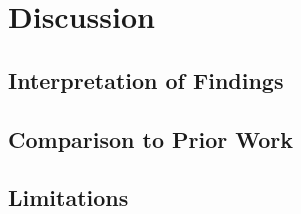 \chapter{Discussion}
\label{ch:discussion}

\section{Interpretation of Findings}

\section{Comparison to Prior Work}

\section{Limitations}
